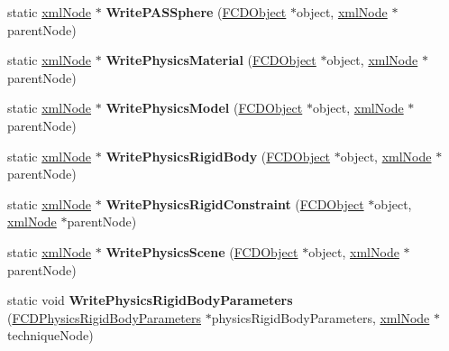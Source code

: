 \begin{DoxyCompactItemize}
\item 
\hypertarget{classFArchiveXML_a9715507d6f1e6c8b163d21fcd26ec83a}{
static \hyperlink{struct__xmlNode}{xmlNode} $\ast$ {\bfseries WritePASSphere} (\hyperlink{classFCDObject}{FCDObject} $\ast$object, \hyperlink{struct__xmlNode}{xmlNode} $\ast$parentNode)}
\label{classFArchiveXML_a9715507d6f1e6c8b163d21fcd26ec83a}

\item 
\hypertarget{classFArchiveXML_aa187f91bf2d3a6a802454705bb4889aa}{
static \hyperlink{struct__xmlNode}{xmlNode} $\ast$ {\bfseries WritePhysicsMaterial} (\hyperlink{classFCDObject}{FCDObject} $\ast$object, \hyperlink{struct__xmlNode}{xmlNode} $\ast$parentNode)}
\label{classFArchiveXML_aa187f91bf2d3a6a802454705bb4889aa}

\item 
\hypertarget{classFArchiveXML_a490b0ec6047d14ad96653d57c978b133}{
static \hyperlink{struct__xmlNode}{xmlNode} $\ast$ {\bfseries WritePhysicsModel} (\hyperlink{classFCDObject}{FCDObject} $\ast$object, \hyperlink{struct__xmlNode}{xmlNode} $\ast$parentNode)}
\label{classFArchiveXML_a490b0ec6047d14ad96653d57c978b133}

\item 
\hypertarget{classFArchiveXML_a90eabd54daf9908c9c92740c244af39b}{
static \hyperlink{struct__xmlNode}{xmlNode} $\ast$ {\bfseries WritePhysicsRigidBody} (\hyperlink{classFCDObject}{FCDObject} $\ast$object, \hyperlink{struct__xmlNode}{xmlNode} $\ast$parentNode)}
\label{classFArchiveXML_a90eabd54daf9908c9c92740c244af39b}

\item 
\hypertarget{classFArchiveXML_afff2889527c35146cc597cb94b403270}{
static \hyperlink{struct__xmlNode}{xmlNode} $\ast$ {\bfseries WritePhysicsRigidConstraint} (\hyperlink{classFCDObject}{FCDObject} $\ast$object, \hyperlink{struct__xmlNode}{xmlNode} $\ast$parentNode)}
\label{classFArchiveXML_afff2889527c35146cc597cb94b403270}

\item 
\hypertarget{classFArchiveXML_a15f11f679910779a3c6210444fe66c5c}{
static \hyperlink{struct__xmlNode}{xmlNode} $\ast$ {\bfseries WritePhysicsScene} (\hyperlink{classFCDObject}{FCDObject} $\ast$object, \hyperlink{struct__xmlNode}{xmlNode} $\ast$parentNode)}
\label{classFArchiveXML_a15f11f679910779a3c6210444fe66c5c}

\item 
\hypertarget{classFArchiveXML_a05898e1765f3ff98dbe0d4c35cd960c5}{
static void {\bfseries WritePhysicsRigidBodyParameters} (\hyperlink{classFCDPhysicsRigidBodyParameters}{FCDPhysicsRigidBodyParameters} $\ast$physicsRigidBodyParameters, \hyperlink{struct__xmlNode}{xmlNode} $\ast$techniqueNode)}
\label{classFArchiveXML_a05898e1765f3ff98dbe0d4c35cd960c5}


\end{DoxyCompactItemize}
